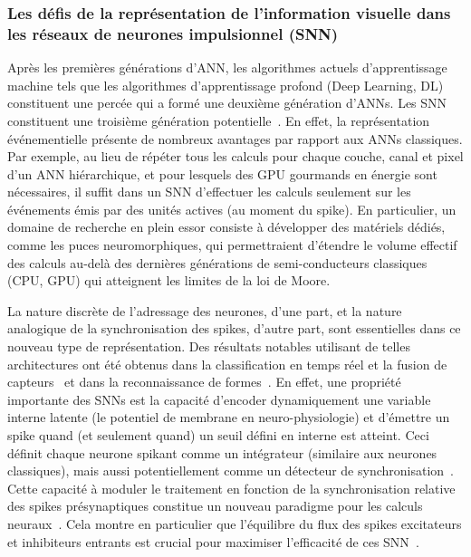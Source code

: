\subsubsection{Les défis de la représentation de l'information visuelle
dans les réseaux de neurones impulsionnel
(SNN)}
Après les premières générations d'ANN, les algorithmes actuels
d'apprentissage machine tels que les algorithmes d'apprentissage profond
(Deep Learning, DL) constituent une percée qui a formé une deuxième génération d'ANNs.
Les SNN constituent une troisième génération potentielle~\citep{Ghosh09}. En effet, la représentation événementielle présente de
nombreux avantages par rapport aux ANNs classiques. Par exemple, au lieu de
répéter tous les calculs ­pour chaque couche, canal et pixel d'un ANN
hiérarchique, et pour lesquels des GPU gourmands en énergie sont
nécessaires, il suffit dans un SNN d'effectuer les calculs seulement sur les événements
émis par des unités actives (au moment du spike). En particulier, un domaine de
recherche en plein essor consiste à développer des matériels dédiés,
comme les puces neuromorphiques, qui permettraient d'étendre le volume
effectif des calculs au-delà des dernières générations de
semi-conducteurs classiques (CPU, GPU) qui atteignent les limites de la
loi de Moore.

La nature discrète de l'adressage des neurones, d'une part, et la nature
analogique de la synchronisation des spikes, d'autre part, sont
essentielles dans ce nouveau type de représentation. Des résultats
notables utilisant de telles architectures ont été obtenus dans la
classification en temps réel et la fusion de capteurs~\citep{Oconnor13} et dans la reconnaissance de formes~\citep{Lagorce17}. En
effet, une propriété importante des SNNs est la capacité d'encoder
dynamiquement une variable interne latente (le potentiel de membrane en
neuro-physiologie) et d'émettre un spike quand (et seulement quand) un
seuil défini en interne est atteint. Ceci définit chaque neurone spikant
comme un intégrateur (similaire aux neurones classiques), mais aussi
potentiellement comme un détecteur de synchronisation~\citep{Perrinet02}.
Cette capacité à moduler le traitement en fonction de la synchronisation
relative des spikes présynaptiques constitue un nouveau paradigme pour les
calculs neuraux~\citep{Paugam12}. Cela montre en
particulier que l'équilibre du flux des spikes excitateurs et inhibiteurs
entrants est crucial pour maximiser l'efficacité de ces SNN~\citep{Hansel12}.

